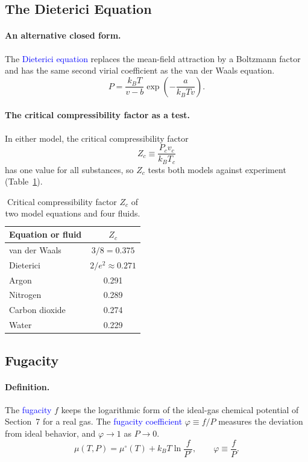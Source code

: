 \subsection{The Dieterici Equation}

\paragraph{An alternative closed form.}
The \textcolor{blue}{Dieterici equation} replaces the mean-field attraction
by a Boltzmann factor and has the same second virial coefficient as the van
der Waals equation.
\begin{equation}
    \boxed{P=\frac{k_BT}{v-b}\exp\!\left(-\frac{a}{k_BTv}\right).}
\end{equation}

\paragraph{The critical compressibility factor as a test.}
In either model, the critical compressibility factor
\begin{equation*}
    Z_c\equiv\frac{P_cv_c}{k_BT_c}
\end{equation*}
has one value for all substances, so $Z_c$ tests both models against
experiment (Table~\ref{tab:Zc}).
\begin{table}[h]
\centering
\caption{Critical compressibility factor $Z_c$ of two model equations and
four fluids.}
\label{tab:Zc}
\begin{tabular}{lc}
    Equation or fluid & $Z_c$ \\ \hline
    van der Waals & $3/8=0.375$ \\
    Dieterici & $2/e^2\approx0.271$ \\
    Argon & 0.291 \\
    Nitrogen & 0.289 \\
    Carbon dioxide & 0.274 \\
    Water & 0.229 \\
\end{tabular}
\end{table}

\subsection{Fugacity}

\paragraph{Definition.}
The \textcolor{blue}{fugacity} $f$ keeps the logarithmic form of the
ideal-gas chemical potential of Section~7 for a real gas. The
\textcolor{blue}{fugacity coefficient} $\varphi\equiv f/P$ measures the
deviation from ideal behavior, and $\varphi\to1$ as $P\to0$.
\begin{equation}
    \boxed{\mu(T,P)=\mu^\circ(T)+k_BT\ln\frac{f}{P^\circ},\qquad
    \varphi\equiv\frac{f}{P}.}
\end{equation}


